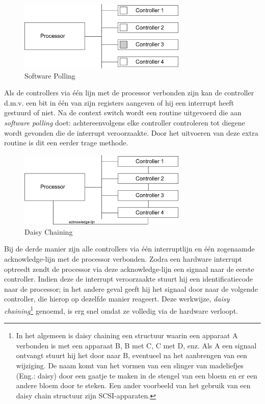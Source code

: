 \begin{figure}
\begin{center}
\includegraphics[width=80mm]{images/fig0204.png}
\end{center}
\caption{Software Polling}
\label{eenlijn}
\end{figure}

Als de controllers via \'e\'en lijn met de processor verbonden zijn
kan de controller d.m.v. een bit in \'e\'en van zijn registers aangeven of
hij een interrupt heeft gestuurd of niet. Na de context switch wordt
een routine uitgevoerd die aan \emph{software polling}
doet: achtereenvolgens elke controller controleren tot diegene wordt
gevonden die de interrupt veroorzaakte. Door het uitvoeren van deze
extra routine is dit een eerder trage methode.

\begin{figure}
\begin{center}
\includegraphics[width=80mm]{images/fig0205.png}
\end{center}
\caption{Daisy Chaining}
\label{daisy}
\end{figure}

Bij de derde manier zijn alle controllers via \'e\'en interruptlijn
en \'e\'en zogenaamde acknowledge-lijn met de processor verbonden. Zodra
een hardware interrupt optreedt zendt de processor via deze
acknowledge-lijn een signaal naar de eerste controller. Indien deze de
interrupt veroorzaakte stuurt hij een identificatiecode naar de
processor; in het andere geval geeft hij het signaal door naar de
volgende controller, die hierop op dezelfde manier reageert. Deze
werkwijze, \emph{daisy chaining}\footnote{In het algemeen is daisy chaining een
structuur waarin een apparaat A verbonden is met een apparaat B, B met C, C met
D, enz. Als A een signaal ontvangt stuurt hij het door naar B, eventueel na het
aanbrengen van een wijziging. De naam komt van het vormen van een slinger van
madeliefjes (Eng.: daisy) door een gaatje te maken in de stengel van een bloem
en er een andere bloem door te steken. Een ander voorbeeld van het gebruik van
een daisy chain structuur zijn SCSI-apparaten.} genoemd, is erg snel omdat ze
volledig via de hardware verloopt.

